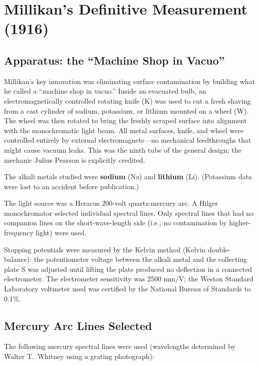 \documentclass[12pt]{article}
\begin{document}
\section{Millikan's Definitive Measurement (1916)}

\subsection{Apparatus: the ``Machine Shop in Vacuo''}

Millikan's key innovation was eliminating surface contamination by building
what he called a ``machine shop in vacuo.''  Inside an evacuated bulb, an
electromagnetically controlled rotating knife (K) was used to cut a fresh
shaving from a cast cylinder of sodium, potassium, or lithium mounted on a
wheel (W).  The wheel was then rotated to bring the freshly scraped surface
into alignment with the monochromatic light beam.  All metal surfaces, knife,
and wheel were controlled entirely by external electromagnets---no mechanical
feedthroughs that might cause vacuum leaks.  This was the ninth tube of the
general design; the mechanic Julius Pearson is explicitly credited.

The alkali metals studied were \textbf{sodium} (Na) and \textbf{lithium} (Li).
(Potassium data were lost to an accident before publication.)

The light source was a Heracus 200-volt quartz-mercury arc.  A Hilger
monochromator selected individual spectral lines.  Only spectral lines that
had no companion lines on the short-wave-length side (i.e., no contamination
by higher-frequency light) were used.

Stopping potentials were measured by the Kelvin method (Kelvin double-balance):
the potentiometer voltage between the alkali metal and the collecting plate S
was adjusted until lifting the plate produced no deflection in a connected
electrometer.  The electrometer sensitivity was 2500 mm/V; the Weston Standard
Laboratory voltmeter used was certified by the National Bureau of Standards to
0.1\%.

\subsection{Mercury Arc Lines Selected}

The following mercury spectral lines were used (wavelengths determined by
Walter T.\ Whitney using a grating photograph):
\end{document}
